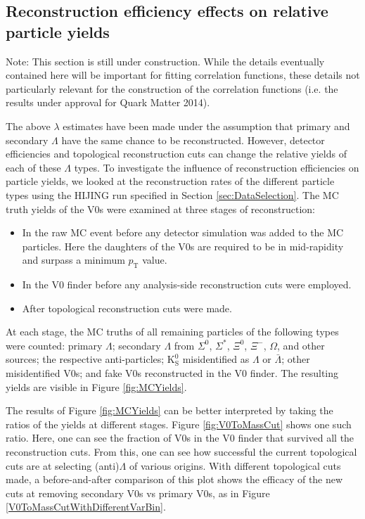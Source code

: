 \subsection{Reconstruction efficiency effects on relative particle yields}
\label{sec:ReconstructionEff}

Note: This section is still under construction.  While the details eventually contained here will be important for fitting correlation functions, these details not particularly relevant for the construction of the correlation functions (i.e. the results under approval for Quark Matter 2014).

The above $\lambda$ estimates have been made under the assumption that primary and secondary $\Lambda$ have the same chance to be reconstructed.  However, detector efficiencies and topological reconstruction cuts can change the relative yields of each of these $\Lambda$ types.  To investigate the influence of reconstruction efficiencies on particle yields, we looked at the reconstruction rates of the different particle types using the HIJING run specified in Section \ref{sec:DataSelection}.  The MC truth yields of the V0s were examined at three stages of reconstruction:
\begin{itemize}
\item In the raw MC event before any detector simulation was added to the MC particles.  Here the daughters of the V0s are required to be in mid-rapidity and surpass a minimum $p_\mathrm{T}$ value.
\item In the V0 finder before any analysis-side reconstruction cuts were employed.
\item After topological reconstruction cuts were made.
\end{itemize}
At each stage, the MC truths of all remaining particles of the following types were counted: primary $\Lambda$; secondary $\Lambda$ from $\Sigma^0$, $\Sigma^*$, $\Xi^0$, $\Xi^-$, $\Omega$, and other sources; the respective anti-particles; $\mathrm{K}^0_{\mathrm{S}}$ misidentified as $\Lambda$ or $\bar{\Lambda}$; other misidentified V0s; and fake V0s reconstructed in the V0 finder.  The resulting yields are visible in Figure \ref{fig:MCYields}.

The results of Figure \ref{fig:MCYields} can be better interpreted by taking the ratios of the yields at different stages.  Figure \ref{fig:V0ToMassCut} shows one such ratio.  Here, one can see the fraction of V0s in the V0 finder that survived all the reconstruction cuts.  From this, one can see how successful the current topological cuts are at selecting (anti)$\Lambda$ of various origins.  With different topological cuts made, a before-and-after comparison of this plot shows the efficacy of the new cuts at removing secondary V0s vs primary V0s, as in Figure \ref{V0ToMassCutWithDifferentVarBin}.

